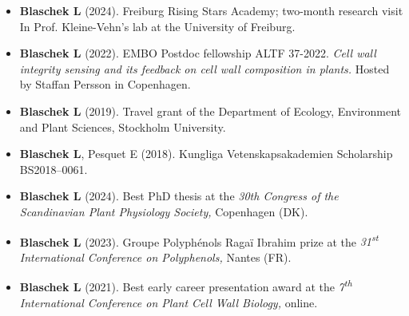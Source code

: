 \documentclass[11pt]{article}
\begin{document}
\vspace{-0.175cm}
\begin{itemize}[label={},itemindent=-9pt,leftmargin=24pt]
	\itemsep-0.1cm
	\item \textbf{Blaschek L} (2024).  Freiburg Rising Stars Academy; two-month research visit In Prof. Kleine-Vehn's lab at the University of Freiburg. 
	\item \textbf{Blaschek L} (2022). EMBO Postdoc fellowship ALTF 37-2022. \textit{Cell wall integrity sensing and its feedback on cell wall composition in plants.} Hosted by Staffan Persson in Copenhagen.
	\item \textbf{Blaschek L} (2019). Travel grant of the Department of Ecology, Environment and Plant Sciences, Stockholm University.
	\item \textbf{Blaschek L}, Pesquet E (2018). Kungliga Vetenskapsakademien Scholarship BS2018--0061.
\end{itemize}
\vspace{0.3cm}

\vspace{-0.175cm}
\begin{itemize}[label={},itemindent=-9pt,leftmargin=24pt]
	\itemsep-0.1cm
	\item \textbf{Blaschek L} (2024). Best PhD thesis at the \textit{30th Congress of the Scandinavian Plant Physiology Society,} Copenhagen (DK). 
	\item \textbf{Blaschek L} (2023). Groupe Polyphénols Ragaï Ibrahim prize at the \textit{31\textsuperscript{st} International Conference on Polyphenols,} Nantes (FR).
	\item \textbf{Blaschek L} (2021). Best early career presentation award at the \textit{7\textsuperscript{th} International Conference on Plant Cell Wall Biology,} online.
\end{itemize}
\vspace{0.3cm}



\vspace{0.3cm}
\end{document}
